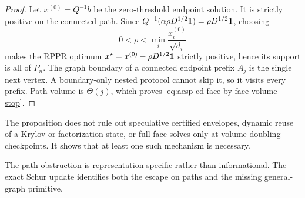 \begin{proof}
Let $x^{(0)}=Q^{-1}b$ be the zero-threshold endpoint solution.  It is strictly
positive on the connected path.  Since
$Q^{-1}(\alpha\rho D^{1/2}\mathbf{1})=\rho D^{1/2}\mathbf{1}$, choosing
\begin{equation*}
 0<\rho<\min_i\frac{x_i^{(0)}}{\sqrt{d_i}}
\end{equation*}
makes the RPPR optimum
$x^\star=x^{(0)}-\rho D^{1/2}\mathbf{1}$ strictly positive, hence its support is
all of $P_n$.  The graph boundary of a connected endpoint prefix $A_j$ is the
single next vertex.  A boundary-only nested protocol cannot skip it, so it
visits every prefix.  Path volume is $\Theta(j)$, which proves
\cref{eq:aesp-cd-face-by-face-volume-stop}.
\end{proof}

The proposition does not rule out speculative certified envelopes, dynamic
reuse of a Krylov or factorization state, or full-face solves only at
volume-doubling checkpoints.  It shows that at least one such mechanism is
necessary.

The path obstruction is representation-specific rather than informational.
The exact Schur update identifies both the escape on paths and the missing
general-graph primitive.


